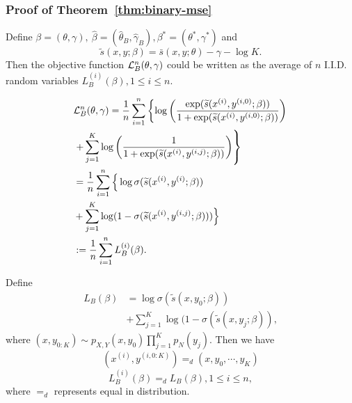 \documentclass[11pt,a4paper]{article}
\newcommand{\wt}[1]{\widetilde{#1}}
\newcommand{\wh}[1]{\widehat{#1}}
\newcommand{\objb}{{\cal L}_B^n}
\newcommand{\ssf}[3]{\bar{s}(#1, #2; #3)}
\newcommand{\sbc}[3]{\wt{s}(#1, #2; #3)}
\begin{document}
\subsubsection{Proof of Theorem~\ref{thm:binary-mse}}
\label{sec:pf-binary-mse}
Define $\beta = (\theta, \gamma), ~\wh{\beta} = (\wh{\theta}_B, \wh{\gamma}_B), \beta^* = (\theta^*, \gamma^*)$ and 
\[
\sbc{x}{y}{\beta} = \ssf{x}{y}{\theta} - \gamma - \log K.
\] 
Then the objective function $\objb(\theta, \gamma)$ could be written as the average of $n$ I.I.D. random variables $L_B^{(i)}(\beta), 1\leq i\leq n$. 
\begin{small}
  \begin{equation}
\begin{aligned}
& \objb(\theta, \gamma) = \frac{1}{n}\sum_{i=1}^n \left\{ \log\left(\frac{\exp(\sbc{x^{(i)}}{y^{(i, 0)}}{\beta})}{1+\exp(\sbc{x^{(i)}}{y^{(i, 0)}}{\beta})}\right) \right. \\
& \left. + \sum_{j=1}^{K}\log\left(\frac{1}{1+\exp(\sbc{x^{(i)}}{y^{(i, j)}}{\beta})}\right)\right\} \\
&  = \frac{1}{n}\sum_{i=1}^n  \Big\{ \log \sigma(\wt{s}(x^{(i)}, y^{(i)}; \beta))  \\
& + \sum_{j=1}^K \log (1-\sigma(\sbc{x^{(i)}}{y^{(i, j)}}{\beta})) \Big\}\\
& := \frac{1}{n} \sum_{i=1}^n L_B^{(i)}(\beta).
\end{aligned}
\end{equation}
\end{small}
Define 
\begin{equation*}
\begin{aligned}
L_B(\beta) &= \log \sigma( \sbc{x}{y_0}{\beta} ) \\ 
& + \sum_{j=1}^K \log (1-\sigma( \sbc{x}{y_j}{\beta}), 
\end{aligned}
\end{equation*}
where $(x, y_{0:K})\sim p_{X, Y}(x, y_0)\prod_{j=1}^K p_N(y_j)$. Then we have 
\[
(x^{(i)}, y^{(i, 0:K)}) =_d (x, y_0, \cdots, y_K)
\]
\[
L^{(i)}_B(\beta) =_d L_B(\beta), 1\leq i \leq n,
\]
where $=_d$ represents equal in distribution. 
\end{document}
